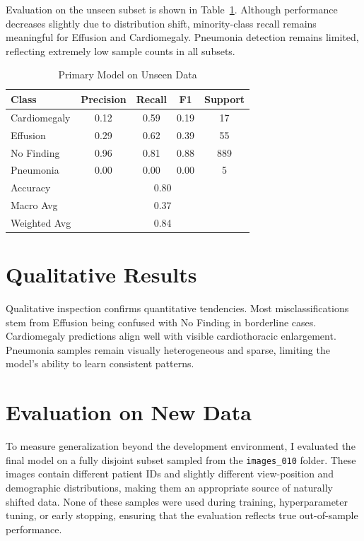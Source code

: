 \documentclass[final]{article}
\begin{document}
Evaluation on the unseen subset is shown in Table~\ref{tab:unseen}. Although performance decreases slightly due to distribution shift, minority-class recall remains meaningful for Effusion and Cardiomegaly. Pneumonia detection remains limited, reflecting extremely low sample counts in all subsets.

\begin{table}[h]
\centering
\caption{Primary Model on Unseen Data}
\label{tab:unseen}
\begin{tabular}{lcccc}
\hline
Class & Precision & Recall & F1 & Support \\
\hline
Cardiomegaly & 0.12 & 0.59 & 0.19 & 17 \\
Effusion & 0.29 & 0.62 & 0.39 & 55 \\
No Finding & 0.96 & 0.81 & 0.88 & 889 \\
Pneumonia & 0.00 & 0.00 & 0.00 & 5 \\
\hline
Accuracy & \multicolumn{4}{c}{0.80} \\
Macro Avg & \multicolumn{4}{c}{0.37} \\
Weighted Avg & \multicolumn{4}{c}{0.84} \\
\hline
\end{tabular}
\end{table}

\section{Qualitative Results}
Qualitative inspection confirms quantitative tendencies. Most misclassifications stem from Effusion being confused with No Finding in borderline cases. Cardiomegaly predictions align well with visible cardiothoracic enlargement. Pneumonia samples remain visually heterogeneous and sparse, limiting the model's ability to learn consistent patterns.

\section{Evaluation on New Data}
To measure generalization beyond the development environment, I evaluated the final model on a fully disjoint subset sampled from the \texttt{images\_010} folder. These images contain different patient IDs and slightly different view-position and demographic distributions, making them an appropriate source of naturally shifted data. None of these samples were used during training, hyperparameter tuning, or early stopping, ensuring that the evaluation reflects true out-of-sample performance.
\end{document}
